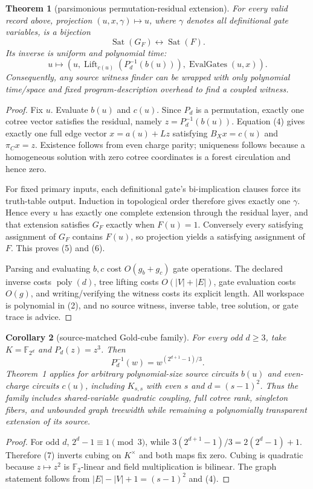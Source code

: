 \documentclass[11pt]{article}
\newtheorem{theorem}{Theorem}
\newtheorem{corollary}[theorem]{Corollary}
\newcommand{\F}{\mathbb F_2}
\begin{document}
\begin{theorem}[parsimonious permutation-residual extension]
For every valid record above, projection $(u,x,\gamma)\mapsto u$, where
$\gamma$ denotes all definitional gate variables, is a bijection
\[
 \operatorname{Sat}(G_F)\longleftrightarrow\operatorname{Sat}(F). \tag{5}
\]
Its inverse is uniform and polynomial time:
\[
 u\longmapsto
 \left(u,
   \operatorname{Lift}_{c(u)}(P_d^{-1}(b(u))),
   \operatorname{EvalGates}(u,x)
 \right).                                               \tag{6}
\]
Consequently, any source witness finder can be wrapped with only polynomial
time/space and fixed program-description overhead to find a coupled witness.
\end{theorem}
\begin{proof}
Fix $u$.  Evaluate $b(u)$ and $c(u)$.  Since $P_d$ is a permutation, exactly
one cotree vector satisfies the residual, namely
$z=P_d^{-1}(b(u))$.  Equation (4) gives exactly one full edge vector
$x=a(u)+Lz$ satisfying $B_Xx=c(u)$ and $\pi_Cx=z$.  Existence follows from
even charge parity; uniqueness follows because a homogeneous solution with
zero cotree coordinates is a forest circulation and hence zero.

For fixed primary inputs, each definitional gate's bi-implication clauses
force its truth-table output.  Induction in topological order therefore gives
exactly one $\gamma$.  Hence every $u$ has exactly one complete extension
through the residual layer, and that extension satisfies $G_F$ exactly when
$F(u)=1$.  Conversely every satisfying assignment of $G_F$ contains
$F(u)$, so projection yields a satisfying assignment of $F$.  This proves
(5) and (6).

Parsing and evaluating $b,c$ cost $O(g_b+g_c)$ gate operations.  The declared
inverse costs $\operatorname{poly}(d)$, tree lifting costs $O(|V|+|E|)$,
gate evaluation costs $O(g)$, and writing/verifying the witness costs its
explicit length.  All workspace is polynomial in (2), and no source witness,
inverse table, tree solution, or gate trace is advice.
\end{proof}

\begin{corollary}[source-matched Gold-cube family]
For every odd $d\ge3$, take $K=\mathbb F_{2^d}$ and $P_d(z)=z^3$.  Then
\[
 P_d^{-1}(w)=w^{(2^{d+1}-1)/3}.                        \tag{7}
\]
Theorem~1 applies for arbitrary polynomial-size source circuits $b(u)$ and
even-charge circuits $c(u)$, including $K_{s,s}$ with even $s$ and
$d=(s-1)^2$.  Thus the family includes shared-variable quadratic coupling,
full cotree rank, singleton fibers, and unbounded graph treewidth while
remaining a polynomially transparent extension of its source.
\end{corollary}
\begin{proof}
For odd $d$, $2^d-1\equiv1\pmod3$, while
$3(2^{d+1}-1)/3=2(2^d-1)+1$.  Therefore (7) inverts cubing on $K^\times$ and
both maps fix zero.  Cubing is quadratic because $z\mapsto z^2$ is
$\F$-linear and field multiplication is bilinear.  The graph statement
follows from $|E|-|V|+1=(s-1)^2$ and (4).
\end{proof}
\end{document}
